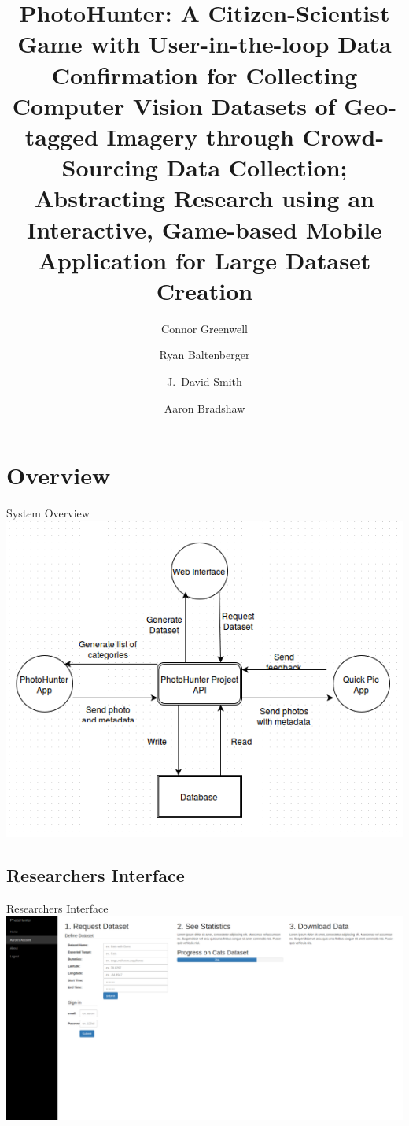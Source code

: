\documentclass[aspectratio=169]{beamer}
\title[PhotoHunter]{PhotoHunter: A Citizen-Scientist Game with User-in-the-loop
  Data Confirmation for Collecting Computer Vision Datasets of
  Geo-tagged Imagery through Crowd-Sourcing Data Collection;
  Abstracting Research using an Interactive, Game-based Mobile
  Application for Large Dataset Creation}
\author[]{Connor Greenwell \and Ryan Baltenberger
  \and J.\ David Smith \and Aaron Bradshaw}
\institute{QuesoTech.com}
\begin{document}
\maketitle

\section{Overview}

\begin{frame}{System Overview}
  \centering
  \includegraphics[width=\textwidth,height=\textheight,keepaspectratio]{ss_flowchart}
\end{frame}

\subsection{Researchers Interface}

\begin{frame}{Researchers Interface}
  \centering
  \includegraphics[width=\textwidth,height=\textheight,keepaspectratio]{researchers}
\end{frame}
\end{document}

